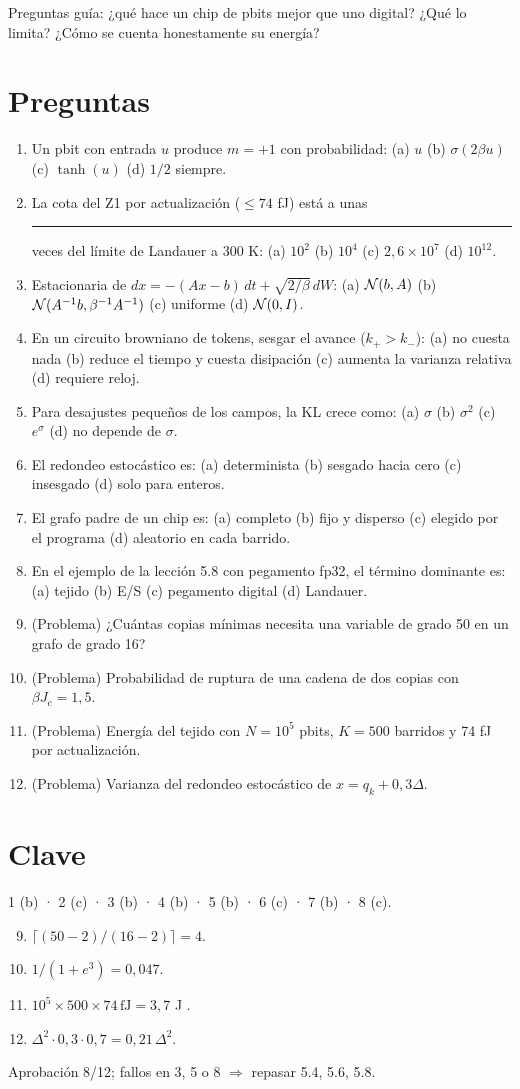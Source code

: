 \documentclass[11pt,a4paper]{article}
\begin{document}
\noindent Preguntas guía: ¿qué hace un chip de pbits mejor que uno digital? ¿Qué lo limita? ¿Cómo se cuenta honestamente su energía?
\section*{Preguntas}
\begin{enumerate}
\item Un pbit con entrada $u$ produce $m=+1$ con probabilidad: (a) $u$ (b) $\sigma(2\beta u)$ (c) $\tanh(u)$ (d) $1/2$ siempre.
\item La cota del Z1 por actualización ($\le74$ fJ) está a unas \rule{1.2cm}{0.4pt} veces del límite de Landauer a 300 K: (a) $10^2$ (b) $10^4$ (c) $2{,}6\times10^7$ (d) $10^{12}$.
\item Estacionaria de $dx=-(Ax-b)\,dt+\sqrt{2/\beta}\,dW$: (a) $\mathcal{N}(b,A)$ (b) $\mathcal{N}(A^{-1}b,\beta^{-1}A^{-1})$ (c) uniforme (d) $\mathcal{N}(0,I)$.
\item En un circuito browniano de tokens, sesgar el avance ($k_+>k_-$): (a) no cuesta nada (b) reduce el tiempo y cuesta disipación (c) aumenta la varianza relativa (d) requiere reloj.
\item Para desajustes pequeños de los campos, la KL crece como: (a) $\sigma$ (b) $\sigma^2$ (c) $e^{\sigma}$ (d) no depende de $\sigma$.
\item El redondeo estocástico es: (a) determinista (b) sesgado hacia cero (c) insesgado (d) solo para enteros.
\item El grafo padre de un chip es: (a) completo (b) fijo y disperso (c) elegido por el programa (d) aleatorio en cada barrido.
\item En el ejemplo de la lección 5.8 con pegamento fp32, el término dominante es: (a) tejido (b) E/S (c) pegamento digital (d) Landauer.
\item (Problema) ¿Cuántas copias mínimas necesita una variable de grado 50 en un grafo de grado 16?
\item (Problema) Probabilidad de ruptura de una cadena de dos copias con $\beta J_c=1{,}5$.
\item (Problema) Energía del tejido con $N=10^5$ pbits, $K=500$ barridos y 74 fJ por actualización.
\item (Problema) Varianza del redondeo estocástico de $x=q_k+0{,}3\Delta$.
\end{enumerate}
\newpage
\section*{Clave}
1 (b) · 2 (c) · 3 (b) · 4 (b) · 5 (b) · 6 (c) · 7 (b) · 8 (c).
\begin{enumerate}\setcounter{enumi}{8}
\item $\lceil(50-2)/(16-2)\rceil=4$.
\item $1/(1+e^{3})=0{,}047$.
\item $10^5\times500\times74\,\text{fJ}=3{,}7$ \textmu J \evE.
\item $\Delta^2\cdot0{,}3\cdot0{,}7=0{,}21\,\Delta^2$.
\end{enumerate}
Aprobación 8/12; fallos en 3, 5 o 8 $\Rightarrow$ repasar 5.4, 5.6, 5.8.
\end{document}
